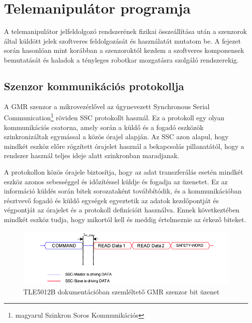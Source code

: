 \chapter{Telemanipulátor programja}
\label{sec:Prog_nagy_fej}

A telemanipulátor jelfeldolgozó rendszerének fizikai összeállítása után a szenzorok által küldött jelek szoftveres feldolgozását és használatát mutatom be. A fejezet során hasonlóan mint korábban a szenzoroktól kezdem a szoftveres komponensek bemutatását és haladok a tényleges robotkar mozgatásra szolgáló rendszerekig.

\section{Szenzor kommunikációs protokollja}
\label{sec:ssc_kom}
A GMR szenzor a mikrovezérlővel az úgynevezett Synchronous Serial Communication\footnote{magyarul Szinkron Soros Kommunikációs} röviden SSC protokollt használ. Ez a protokoll egy olyan kommunikációs csatorna, amely során a küldő és a fogadó eszközök szinkronizáltak egymással a közös órajel alapján. Az SSC azon alapul, hogy mindkét eszköz előre rögzített órajelet használ a bekapcsolás pillanatától, hogy a rendszer használ teljes ideje alatt szinkronban maradjanak.

A protokollon közös órajele biztosítja, hogy az adat transzferálás esetén mindkét eszköz azonos sebességgel és időzítéssel küldje és fogadja az üzenetet. Ez az információ küldés során bitek sorozataként továbbítódik, és a kommunikációban résztvevő fogadó és küldő egységek egyeztetik az adatok kezdőpontját és végpontját az órajelet és a protokoll definícióit használva. Ennek következtében mindkét eszköz tudja, hogy mikortól kell és meddig értelmeznie az érkező biteket.

\begin{figure}[!ht]
\centering
\includegraphics[width=120mm, keepaspectratio]{figures/Szenzor/tle5012b_bitek}
\caption{TLE5012B dokumentációban szemléltető GMR szenzor bit üzenet}
\label{fig:szenzor_bitek}
\end{figure}

